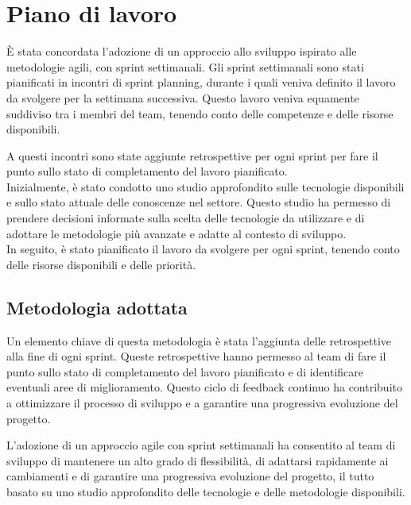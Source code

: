 

\section{Piano di lavoro}
È stata concordata l'adozione di un approccio allo sviluppo ispirato alle
metodologie agili, con sprint settimanali. Gli sprint settimanali sono stati pianificati in incontri di sprint planning, durante i quali veniva definito il lavoro da svolgere per la settimana successiva. Questo lavoro veniva equamente suddiviso tra i membri del team, tenendo conto delle competenze e delle risorse disponibili.


A questi incontri sono state aggiunte retrospettive
per ogni sprint per fare il punto sullo stato di completamento del lavoro pianificato.\\

Inizialmente, è stato condotto uno studio approfondito sulle tecnologie disponibili e sullo stato attuale delle conoscenze nel settore. Questo studio ha permesso di prendere decisioni informate sulla scelta delle tecnologie da utilizzare e di adottare le metodologie più avanzate e adatte al contesto di sviluppo.\\

In seguito, è stato pianificato il lavoro da svolgere per ogni sprint, tenendo conto
delle risorse disponibili e delle priorità.\\




\subsection{Metodologia adottata}
Un elemento chiave di questa metodologia è stata l'aggiunta delle retrospettive alla fine di ogni sprint. Queste retrospettive hanno permesso al team di fare il punto sullo stato di completamento del lavoro pianificato e di identificare eventuali aree di miglioramento. Questo ciclo di feedback continuo ha contribuito a ottimizzare il processo di sviluppo e a garantire una progressiva evoluzione del progetto.

L'adozione di un approccio agile con sprint settimanali ha consentito al team di sviluppo di mantenere un alto grado di flessibilità, di adattarsi rapidamente ai cambiamenti e di garantire una progressiva evoluzione del progetto, il tutto basato su uno studio approfondito delle tecnologie e delle metodologie disponibili.

